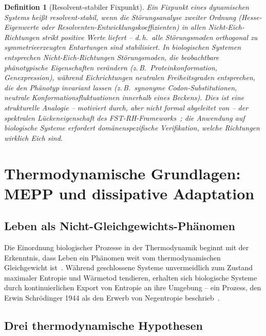 \documentclass[12pt,a4paper]{article}
\newtheorem{definition}{Definition}
\theoremstyle{remark}
\begin{document}
\begin{definition}[Resolvent-stabiler Fixpunkt]
\label{def:resolvent-stable}
Ein Fixpunkt eines dynamischen Systems heißt \emph{resolvent-stabil}, wenn die Störungsanalyse zweiter Ordnung (Hesse-Eigenwerte oder Resolventen-Entwicklungskoeffizienten) in allen Nicht-Eich-Richtungen strikt positive Werte liefert -- d.\,h.\ alle Störungsmoden orthogonal zu symmetrieerzeugten Entartungen sind stabilisiert. In biologischen Systemen entsprechen \glqq Nicht-Eich-Richtungen\grqq{} Störungsmoden, die beobachtbare phänotypische Eigenschaften verändern (z.\,B.\ Proteinkonformation, Genexpression), während \glqq Eichrichtungen\grqq{} neutralen Freiheitsgraden entsprechen, die den Phänotyp invariant lassen (z.\,B.\ synonyme Codon-Substitutionen, neutrale Konformationsfluktuationen innerhalb eines Beckens). Dies ist eine strukturelle Analogie -- motiviert durch, aber nicht formal abgeleitet von -- der spektralen Lückeneigenschaft des FST-RH-Frameworks~\citep{GeigerRH2026b}; die Anwendung auf biologische Systeme erfordert domänenspezifische Verifikation, welche Richtungen wirklich \glqq Eich\grqq{} sind.
\end{definition}

\section{Thermodynamische Grundlagen: MEPP und dissipative Adaptation}
\label{sec:thermodynamics}

\subsection{Leben als Nicht-Gleichgewichts-Phänomen}

Die Einordnung biologischer Prozesse in der Thermodynamik beginnt mit der Erkenntnis, dass Leben ein Phänomen weit vom thermodynamischen Gleichgewicht ist~\citep{EcosystemMEPP}. Während geschlossene Systeme unvermeidlich zum Zustand maximaler Entropie und Wärmetod tendieren, erhalten sich biologische Systeme durch kontinuierlichen Export von Entropie an ihre Umgebung -- ein Prozess, den Erwin Schrödinger 1944 als den Erwerb von \glqq Negentropie\grqq{} beschrieb~\citep{SchoolBiologicalPhysics,EcosystemMEPP,Kuzu2025}.

\subsection{Drei thermodynamische Hypothesen}
\end{document}

